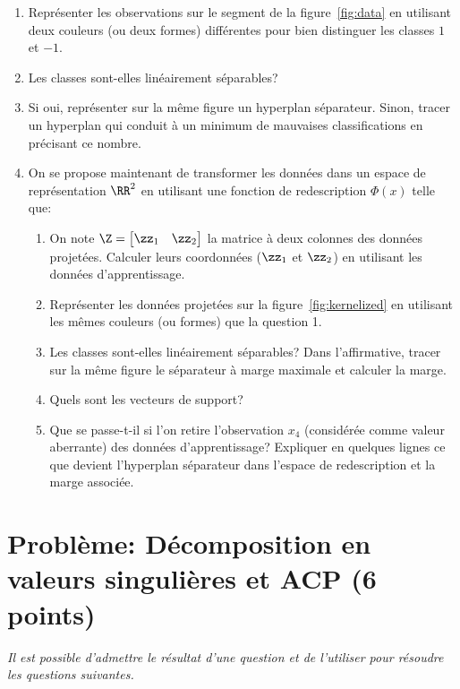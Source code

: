 \documentclass[11pt]{article}
\begin{document}
\begin{enumerate}
	\item Représenter les observations sur le segment de la figure~\ref{fig:data} en utilisant deux couleurs (ou deux formes) différentes pour bien distinguer les classes $1$ et $-1$.
	\item Les classes sont-elles linéairement séparables?
	\item Si oui, représenter sur la même figure un hyperplan séparateur. Sinon, tracer un hyperplan qui conduit à un minimum de mauvaises classifications en précisant ce nombre.
	\item On se propose maintenant de transformer les données dans un espace de représentation $\RR^2$ en utilisant une fonction de redescription $\Phi(x)$ telle que:
	\begin{enumerate}
		\item On note $\Z = \begin{bmatrix} \zz_1 & \zz_2 \end{bmatrix}$ la matrice à deux colonnes des données projetées. Calculer leurs coordonnées ($\zz_1$ et $\zz_2$) en utilisant les données d'apprentissage.
		\item Représenter les données projetées sur la figure~\ref{fig:kernelized} en utilisant les mêmes couleurs (ou formes) que la question 1.
		\item Les classes sont-elles linéairement séparables? Dans l'affirmative, tracer sur la même figure le séparateur à marge maximale et calculer la marge.
		\item Quels sont les vecteurs de support?
		\item Que se passe-t-il si l'on retire l'observation $x_4$ (considérée comme valeur aberrante) des données d'apprentissage? Expliquer en quelques lignes ce que devient l'hyperplan séparateur dans l'espace de redescription et la marge associée.
	\end{enumerate}
\end{enumerate}




\section{Problème: Décomposition en valeurs singulières et ACP (6 points)}
\textit{Il est possible d'admettre le résultat d'une question et de l'utiliser pour résoudre les questions suivantes.}
\end{document}
